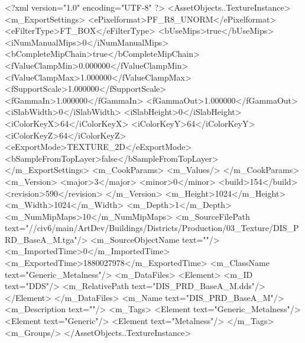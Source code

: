 <?xml version="1.0" encoding="UTF-8" ?>
<AssetObjects..TextureInstance>
	<m_ExportSettings>
		<ePixelformat>PF_R8_UNORM</ePixelformat>
		<eFilterType>FT_BOX</eFilterType>
		<bUseMips>true</bUseMips>
		<iNumManualMips>0</iNumManualMips>
		<bCompleteMipChain>true</bCompleteMipChain>
		<fValueClampMin>0.000000</fValueClampMin>
		<fValueClampMax>1.000000</fValueClampMax>
		<fSupportScale>1.000000</fSupportScale>
		<fGammaIn>1.000000</fGammaIn>
		<fGammaOut>1.000000</fGammaOut>
		<iSlabWidth>0</iSlabWidth>
		<iSlabHeight>0</iSlabHeight>
		<iColorKeyX>64</iColorKeyX>
		<iColorKeyY>64</iColorKeyY>
		<iColorKeyZ>64</iColorKeyZ>
		<eExportMode>TEXTURE_2D</eExportMode>
		<bSampleFromTopLayer>false</bSampleFromTopLayer>
	</m_ExportSettings>
	<m_CookParams>
		<m_Values/>
	</m_CookParams>
	<m_Version>
		<major>3</major>
		<minor>0</minor>
		<build>154</build>
		<revision>590</revision>
	</m_Version>
	<m_Height>1024</m_Height>
	<m_Width>1024</m_Width>
	<m_Depth>1</m_Depth>
	<m_NumMipMaps>10</m_NumMipMaps>
	<m_SourceFilePath text="//civ6/main/ArtDev/Buildings/Districts/Production/03_Texture/DIS_PRD_BaseA_M.tga"/>
	<m_SourceObjectName text=""/>
	<m_ImportedTime>0</m_ImportedTime>
	<m_ExportedTime>1880027978</m_ExportedTime>
	<m_ClassName text="Generic_Metalness"/>
	<m_DataFiles>
		<Element>
			<m_ID text="DDS"/>
			<m_RelativePath text="DIS_PRD_BaseA_M.dds"/>
		</Element>
	</m_DataFiles>
	<m_Name text="DIS_PRD_BaseA_M"/>
	<m_Description text=""/>
	<m_Tags>
		<Element text="Generic_Metalness"/>
		<Element text="Generic"/>
		<Element text="Metalness"/>
	</m_Tags>
	<m_Groups/>
</AssetObjects..TextureInstance>

